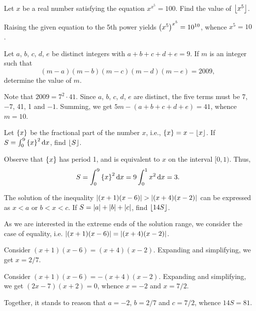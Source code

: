 \begin{question}[10]\label{Q::2024-O-1-11}
    Let $x$ be a real number satisfying the equation $x^{x^5} = 100$. Find the value of $\left\lfloor x^5 \right\rfloor$.
\end{question}
\begin{solution*}
    Raising the given equation to the 5th power yields $\left( x^5 \right)^{x^5} = 10^{10}$, whence $x^5 = 10$.
\end{solution*}

\begin{question}[10]\label{Q::2024-O-1-12}
    Let $a$, $b$, $c$, $d$, $e$ be distinct integers with $a + b + c + d + e = 9$. If $m$ is an integer such that \[(m-a)(m-b)(m-c)(m-d)(m-e) = 2009,\] determine the value of $m$.
\end{question}
\begin{solution*}
    Note that $2009 = 7^2 \cdot 41$. Since $a$, $b$, $c$, $d$, $e$ are distinct, the five terms must be 7, $-7$, 41, 1 and $-1$. Summing, we get $5m - (a + b + c + d + e) = 41$, whence $m = 10$.
\end{solution*}

\begin{question}[3]\label{Q::2024-O-1-13}
    Let $\left\lbrace x \right\rbrace$ be the fractional part of the number $x$, i.e., $\left\lbrace x \right\rbrace = x - \left\lfloor x \right\rfloor$. If $S = \int_0^9 \left\lbrace x \right\rbrace^2 \mathop{\mathrm{d}x}$, find $\left\lfloor S \right\rfloor$.
\end{question}
\begin{solution*}
    Observe that $\left\lbrace x \right\rbrace$ has period 1, and is equivalent to $x$ on the interval $[0, 1)$. Thus, \[S = \int_0^9 \left\lbrace x \right\rbrace^2 \mathop{\mathrm{d}x} = 9 \int_0^1 x^2 \mathop{\mathrm{d}x} = 3.\]
\end{solution*}

\begin{question}[81]\label{Q::2024-O-1-14}
    The solution of the inequality $\left\lvert (x+1)(x-6) \right\rvert > \left\lvert (x+4)(x-2) \right\rvert$ can be expressed as $x < a$ or $b < x < c$. If $S = \left\lvert a \right\rvert + \left\lvert b \right\rvert + \left\lvert c \right\rvert$, find $\left\lfloor 14S \right\rfloor$.
\end{question}
\begin{solution*}
    As we are interested in the extreme ends of the solution range, we consider the case of equality, i.e. $\left\lvert (x+1)(x-6) \right\rvert = \left\lvert (x+4)(x-2) \right\rvert$.

     Consider $(x+1)(x-6) = (x+4)(x-2)$. Expanding and simplifying, we get $x = 2/7$.

     Consider $(x+1)(x-6) = -(x+4)(x-2)$. Expanding and simplifying, we get $(2x-7)(x+2) = 0$, whence $x = -2$ and $x = 7/2$.

    Together, it stands to reason that $a = -2$, $b = 2/7$ and $c = 7/2$, whence $14S = 81$.
\end{solution*}

